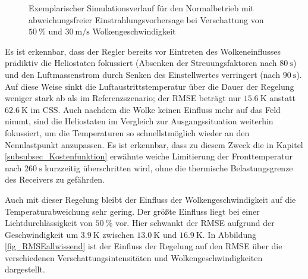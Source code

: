 \begin{figure}[h!]
    \centering
    \setlength{\fboxsep}{1pt}
    \setlength{\fboxrule}{1pt}
\caption[Exemplarischer Simulationsverlauf für den Normalbetrieb mit abweichungsfreier Einstrahlungsvorhersage bei Verschattung von $\SI{50}{\percent}$ und $\SI{30}{\metre\per\second}$ Wolkengeschwindigkeit]{Exemplarischer Simulationsverlauf für den Normalbetrieb mit abweichungsfreier Einstrahlungsvorhersage bei Verschattung von $\SI{50}{\percent}$ und $\SI{30}{\metre\per\second}$ Wolkengeschwindigkeit}
    \label{fig_MPCallwissend5030}
\end{figure}


Es ist erkennbar, dass der Regler bereits vor Eintreten des Wolkeneinflusses prädiktiv die Heliostaten fokussiert (Absenken der Streuungsfaktoren nach $\SI{80}{\second}$) und den Luftmassenstrom durch Senken des Einstellwertes verringert (nach $\SI{90}{\second}$).
Auf diese Weise sinkt die Luftaustrittstemperatur über die Dauer der Regelung weniger stark ab als im Referenzszenario; der RMSE beträgt nur $\SI{15.6}{\kelvin}$ anstatt $\SI{62.6}{\kelvin}$ im CSS.
Auch nachdem die Wolke keinen Einfluss mehr auf das Feld nimmt, sind die Heliostaten im Vergleich zur Ausgangssituation weiterhin fokussiert, um die Temperaturen so schnellstmöglich wieder an den Nennlastpunkt anzupassen.
Es ist erkennbar, dass zu diesem Zweck die in Kapitel \ref{subsubsec_Kostenfunktion} erwähnte weiche Limitierung der Fronttemperatur nach $\SI{260}{\second}$ kurzzeitig überschritten wird, ohne die thermische Belastungsgrenze des Receivers zu gefährden.

Auch mit dieser Regelung bleibt der Einfluss der Wolkengeschwindigkeit auf die Temperaturabweichung sehr gering.
Der größte Einfluss liegt bei einer Lichtdurchlässigkeit von $\SI{50}{\percent}$ vor.
Hier schwankt der RMSE aufgrund der Geschwindigkeit um $\SI{3.9}{\kelvin}$ zwischen $\SI{13.0}{\kelvin}$ und $\SI{16.9}{\kelvin}$.
In Abbildung \ref{fig_RMSEallwissend} ist der Einfluss der Regelung auf den RMSE über die verschiedenen Verschattungsintensitäten und Wolkengeschwindigkeiten dargestellt.

